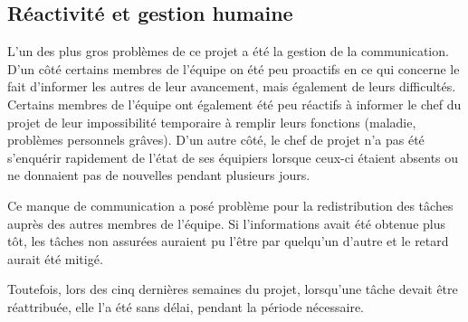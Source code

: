 \subsection{Réactivité et gestion humaine}

L'un des plus gros problèmes de ce projet a été la gestion de
la communication. D'un côté certains membres de l'équipe on
été peu proactifs en ce qui concerne le fait d'informer les
autres de leur avancement, mais également de leurs
difficultés. Certains membres de l'équipe ont également été
peu réactifs à informer le chef du projet de leur
impossibilité temporaire à remplir leurs fonctions (maladie,
problèmes personnels grâves). D'un autre côté, le chef de
projet n'a pas été s'enquérir rapidement de l'état de ses
équipiers lorsque ceux-ci étaient absents ou ne donnaient pas
de nouvelles pendant plusieurs jours.
\newline

Ce manque de communication a posé problème pour la
redistribution des tâches auprès des autres membres de
l'équipe. Si l'informations avait été obtenue plus tôt, les
tâches non assurées auraient pu l'être par quelqu'un d'autre
et le retard aurait été mitigé.
\newline

Toutefois, lors des cinq dernières semaines du projet,
lorsqu'une tâche devait être réattribuée, elle l'a été sans
délai, pendant la période nécessaire.
